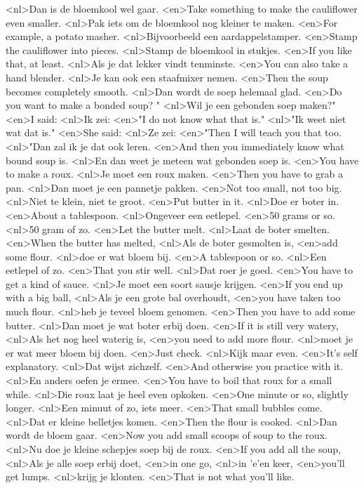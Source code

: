 <nl>Dan is de bloemkool wel gaar.
<en>Take something to make the cauliflower even smaller.
<nl>Pak iets om de bloemkool nog kleiner te maken.
<en>For example, a potato masher.
<nl>Bijvoorbeeld een aardappelstamper.
<en>Stamp the cauliflower into pieces.
<nl>Stamp de bloemkool in stukjes.
<en>If you like that, at least.
<nl>Als je dat lekker vindt tenminste.
<en>You can also take a hand blender.
<nl>Je kan ook een staafmixer nemen.
<en>Then the soup becomes completely smooth.
<nl>Dan wordt de soep helemaal glad.
<en>Do you want to make a bonded soup? "
<nl>Wil je een gebonden soep maken?"
<en>I said:
<nl>Ik zei:
<en>"I do not know what that is."
<nl>"Ik weet niet wat dat is."
<en>She said:
<nl>Ze zei:
<en>"Then I will teach you that too.
<nl>"Dan zal ik je dat ook leren.
<en>And then you immediately know what bound soup is.
<nl>En dan weet je meteen wat gebonden soep is.
<en>You have to make a roux.
<nl>Je moet een roux maken.
<en>Then you have to grab a pan.
<nl>Dan moet je een  pannetje pakken.
<en>Not too small, not too big.
<nl>Niet te klein, niet te groot.
<en>Put butter in it.
<nl>Doe er boter in.
<en>About a tablespoon.
<nl>Ongeveer een eetlepel.
<en>50 grams or so.
<nl>50 gram of zo.
<en>Let the butter melt.
<nl>Laat de boter smelten.
<en>When the butter has melted, 
<nl>Als de boter gesmolten is, 
<en>add some flour.
<nl>doe er wat bloem bij.
<en>A tablespoon or so.
<nl>Een eetlepel of zo.
<en>That you stir well.
<nl>Dat roer je goed.
<en>You have to get a kind of sauce.
<nl>Je moet een soort sausje krijgen.
<en>If you end up with a big ball,
<nl>Als je een grote bal overhoudt,
<en>you have taken too much flour.
<nl>heb je teveel bloem genomen.
<en>Then you have to add some butter.
<nl>Dan moet je wat boter erbij doen.
<en>If it is still very watery, 
<nl>Als het nog heel waterig is, 
<en>you need to add more flour.
<nl>moet je er wat meer bloem bij doen.
<en>Just check.
<nl>Kijk maar even.
<en>It's self explanatory.
<nl>Dat wijst zichzelf.
<en>And otherwise you practice with it.
<nl>En anders oefen je ermee.
<en>You have to  boil that roux for a small while.
<nl>Die roux laat je heel even opkoken.
<en>One minute or so, slightly longer.
<nl>Een minuut of zo, iets meer.
<en>That small bubbles come.
<nl>Dat er kleine belletjes komen.
<en>Then the flour is cooked.
<nl>Dan wordt de bloem gaar.
<en>Now you add small scoops of soup to the roux.
<nl>Nu doe je kleine schepjes soep bij de roux.
<en>If you add all the soup,
<nl>Als je alle soep erbij doet,
<en>in one go,
<nl>in 'e'en keer,
<en>you'll get lumps.
<nl>krijg je klonten.
<en>That is not what you'll like.
